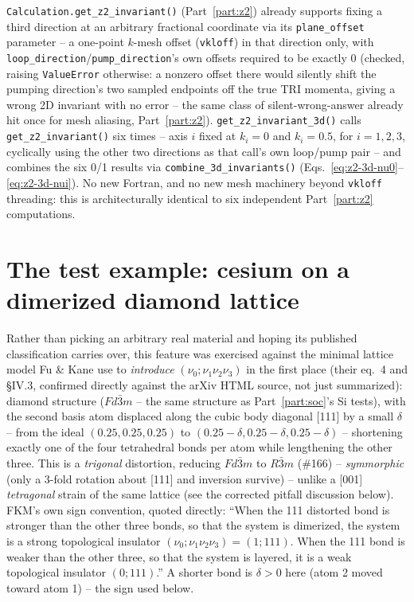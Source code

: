 \documentclass[11pt]{article}
\begin{document}
\texttt{Calculation.get\_z2\_invariant()} (Part~\ref{part:z2}) already supports fixing
a third direction at an arbitrary fractional coordinate via its \texttt{plane\_offset}
parameter -- a one-point $k$-mesh offset (\texttt{vkloff}) in that direction only, with
\texttt{loop\_direction}/\texttt{pump\_direction}'s own offsets required to be exactly
0 (checked, raising \texttt{ValueError} otherwise: a nonzero offset there would
silently shift the pumping direction's two sampled endpoints off the true TRI momenta,
giving a wrong 2D invariant with no error -- the same class of silent-wrong-answer
already hit once for mesh aliasing, Part~\ref{part:z2}). \texttt{get\_z2\_invariant\_3d()}
calls \texttt{get\_z2\_invariant()} six times -- axis $i$ fixed at $k_i=0$ and
$k_i=0.5$, for $i=1,2,3$, cyclically using the other two directions as that call's own
loop/pump pair -- and combines the six 0/1 results via
\texttt{combine\_3d\_invariants()} (Eqs.~\eqref{eq:z2-3d-nu0}--\eqref{eq:z2-3d-nui}).
No new Fortran, and no new mesh machinery beyond \texttt{vkloff} threading: this is
architecturally identical to six independent Part~\ref{part:z2} computations.

\section{The test example: cesium on a dimerized diamond lattice}

Rather than picking an arbitrary real material and hoping its published classification
carries over, this feature was exercised against the minimal lattice model Fu \&
Kane use to \emph{introduce} $(\nu_0;\nu_1\nu_2\nu_3)$ in the first place
\cite{fukane2007} (their eq.\ 4 and \S IV.3, confirmed directly against the arXiv HTML
source, not just summarized): diamond structure ($Fd\bar3m$ -- the same structure as
Part~\ref{part:soc}'s Si tests), with the second basis atom displaced along the cubic
body diagonal [111] by a small $\delta$ -- from the ideal $(0.25,0.25,0.25)$ to
$(0.25{-}\delta,0.25{-}\delta,0.25{-}\delta)$ -- shortening exactly one of the four
tetrahedral bonds per atom while lengthening the other three. This is a \emph{trigonal}
distortion, reducing $Fd\bar3m$ to $R\bar3m$ (\#166) -- \emph{symmorphic} (only a
3-fold rotation about [111] and inversion survive) -- unlike a [001] \emph{tetragonal}
strain of the same lattice (see the corrected pitfall discussion below). FKM's own
sign convention, quoted directly: ``When the 111 distorted bond is stronger than the
other three bonds, so that the system is dimerized, the system is a strong topological
insulator $(\nu_0;\nu_1\nu_2\nu_3)=(1;111)$. When the 111 bond is weaker than the other
three, so that the system is layered, it is a weak topological insulator $(0;111)$.'' A
shorter bond is $\delta>0$ here (atom 2 moved toward atom 1) -- the sign used below.
\end{document}
